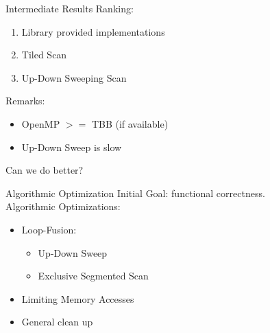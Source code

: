 \begin{frame}{Intermediate Results}
 Ranking:
 \begin{enumerate}
  \item Library provided implementations
  \item Tiled Scan
  \item Up-Down Sweeping Scan 
 \end{enumerate}
 Remarks:
 \begin{itemize}
  \item OpenMP $>=$ TBB (if available)
  \item Up-Down Sweep is slow
 \end{itemize}
 \vspace{10pt}
    \centering Can we do better?
\end{frame}

\begin{frame}{Algorithmic Optimization}
Initial Goal: functional correctness.\\
\vspace{20pt}
Algorithmic Optimizations:
\begin{itemize}
 \item Loop-Fusion:
 \begin{itemize}
  \item Up-Down Sweep
  \item Exclusive Segmented Scan
 \end{itemize}
 \item Limiting Memory Accesses
 \item General clean up
\end{itemize}
\end{frame} 

%  
%  
% 
%  
%  

